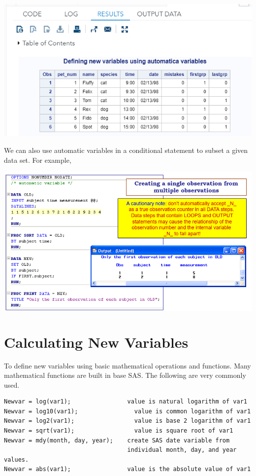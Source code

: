 \documentclass[
]{book}
\begin{document}
\begin{center}\includegraphics[width=1\linewidth]{img09/w09-autoVarNewFun} \end{center}

We can also use automatic variables in a conditional statement to subset a given data set. For example,

\begin{center}\includegraphics[width=1\linewidth]{img09/w09-First.varSubsetting} \end{center}

\hypertarget{calculating-new-variables}{%
\section{Calculating New Variables}\label{calculating-new-variables}}

To define new variables using basic mathematical operations and functions. Many mathematical functions are built in base SAS. The following are very commonly used.

\begin{verbatim}
Newvar = log(var1);                value is natural logarithm of var1
Newvar = log10(var1);                value is common logarithm of var1
Newvar = log2(var1);                 value is base 2 logarithm of var1
Newvar = sqrt(var1);                 value is square root of var1
Newvar = mdy(month, day, year);    create SAS date variable from   
                                   individual month, day, and year values.
Newvar = abs(var1);                value is the absolute value of var1
\end{verbatim}
\end{document}
